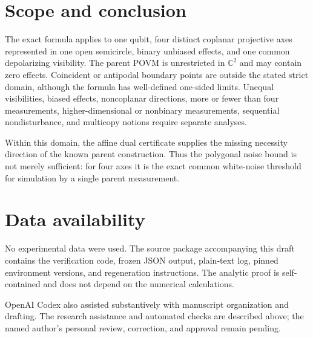 \documentclass[aps,pra,reprint,superscriptaddress,nofootinbib,longbibliography]{revtex4-2}
\begin{document}
\section{Scope and conclusion}

The exact formula applies to one qubit, four distinct coplanar projective
axes represented in one open semicircle, binary unbiased effects, and one
common depolarizing visibility.  The parent POVM is unrestricted in
$\mathbb C^2$ and may contain zero effects.  Coincident or antipodal boundary
points are outside the stated strict domain, although the formula has
well-defined one-sided limits.  Unequal visibilities, biased effects,
noncoplanar directions, more or fewer than four measurements,
higher-dimensional or nonbinary measurements, sequential nondisturbance,
and multicopy notions require separate analyses.

Within this domain, the affine dual certificate supplies the missing
necessity direction of the known parent construction.  Thus the polygonal
noise bound is not merely sufficient: for four axes it is the exact common
white-noise threshold for simulation by a single parent measurement.

\section*{Data availability}

No experimental data were used.  The source package accompanying this draft
contains the verification code, frozen JSON output, plain-text log, pinned
environment versions, and regeneration instructions.  The analytic proof is
self-contained and does not depend on the numerical calculations.

\begin{acknowledgments}
OpenAI Codex also assisted substantively with manuscript organization and
drafting.  The research assistance and automated checks are described above;
the named author's personal review, correction, and approval remain pending.
\end{acknowledgments}


\end{document}
